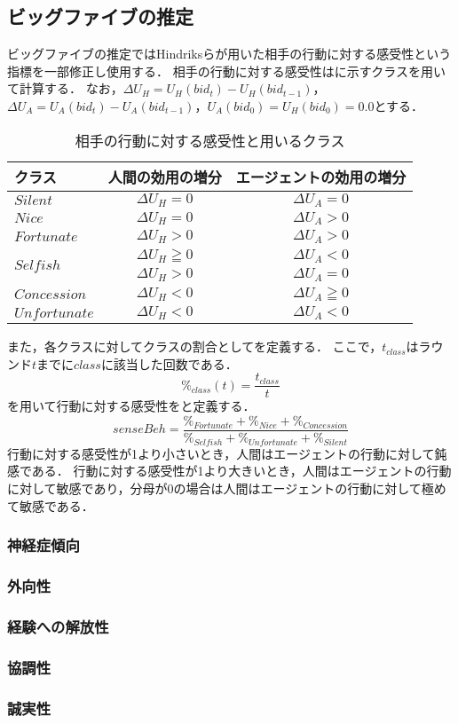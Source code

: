\subsection{ビッグファイブの推定}
ビッグファイブの推定ではHindriksら\cite{sensebeh}が用いた相手の行動に対する感受性という指標を一部修正し使用する．
相手の行動に対する感受性はに示すクラスを用いて計算する．
なお，$\Delta U_H = U_H(bid_t) - U_H(bid_{t - 1})$，$\Delta U_A = U_A(bid_t) - U_A(bid_{t - 1})$，$U_A(bid_0) = U_H(bid_0) = 0.0$とする．
\begin{table}[b]
    \centering
    \caption{相手の行動に対する感受性と用いるクラス}
    \begin{tabular}{lcc} \toprule
        クラス & 人間の効用の増分 & エージェントの効用の増分 \\ \midrule
        $Silent$ & $\Delta U_H = 0$ & $\Delta U_A = 0$ \\
        $Nice$ & $\Delta U_H = 0$ & $\Delta U_A > 0$ \\
        $Fortunate$ & $\Delta U_H > 0$ & $\Delta U_A > 0$ \\
        \multirow{2}{*}{$Selfish$} & $\Delta U_H \geqq 0$ & $\Delta U_A < 0$ \\ 
         & $\Delta U_H > 0$ & $\Delta U_A = 0$ \\ 
        $Concession$ & $\Delta U_H < 0$ & $\Delta U_A \geqq 0$ \\
        $Unfortunate$ & $\Delta U_H < 0$ & $\Delta U_A < 0$ \\ \bottomrule
    \end{tabular}
    \label{tab:sensebeh}
\end{table}

また，各クラスに対してクラスの割合としてを定義する．
ここで，$t_{class}$はラウンド$t$までに$class$に該当した回数である．
\begin{equation}
    \%_{class}(t) = \frac{t_{class}}{t} 
    \label{eq:class}
\end{equation}
を用いて行動に対する感受性をと定義する．
\begin{equation}
    senseBeh = \frac{\%_{Fortunate} + \%_{Nice} + \%_{Concession}}{\%_{Selfish} + \%_{Unfortunate} + \%_{Silent}} 
    \label{eq:sensebeh}
\end{equation}
行動に対する感受性が1より小さいとき，人間はエージェントの行動に対して鈍感である．
行動に対する感受性が1より大きいとき，人間はエージェントの行動に対して敏感であり，分母が0の場合は人間はエージェントの行動に対して極めて敏感である．

\subsubsection{神経症傾向}

\subsubsection{外向性}
\subsubsection{経験への解放性}
\subsubsection{協調性}
\subsubsection{誠実性}


